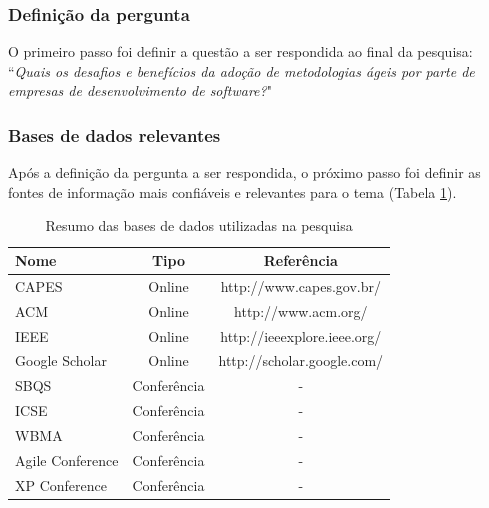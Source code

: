 \documentclass[a4paper,11pt]{article}
\begin{document}
		\subsubsection{Definição da pergunta}
			O primeiro passo foi definir a questão a ser respondida ao final da pesquisa: ``\textit{Quais os desafios e benefícios da adoção de metodologias ágeis por parte de empresas de desenvolvimento de software?}"
		\subsubsection{Bases de dados relevantes}
			Após a definição da pergunta a ser respondida, o próximo passo foi definir as fontes de informação mais confiáveis e relevantes para o tema (Tabela \ref{tab:basesDeDados}).
			\begin{table}[H]
				\centering
				\begin{tabular}{ | l | c | c | } \hline \textbf{Nome} & \textbf{Tipo} & \textbf{Referência} \\ \hline
					CAPES & Online & http://www.capes.gov.br/ \\ \hline
					ACM & Online & http://www.acm.org/ \\ \hline
					IEEE & Online & http://ieeexplore.ieee.org/ \\ \hline
					Google Scholar & Online & http://scholar.google.com/ \\ \hline
					SBQS & Conferência & - \\ \hline
					ICSE & Conferência & - \\ \hline
					WBMA & Conferência & - \\ \hline
					Agile Conference & Conferência & - \\ \hline
					XP Conference & Conferência & - \\ \hline
				\end{tabular}
				\caption{Resumo das bases de dados utilizadas na pesquisa}
				\label{tab:basesDeDados}
			\end{table}
\end{document}
